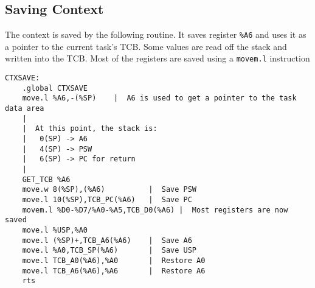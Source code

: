 \documentclass[10pt, openany]{book}
\begin{document}
\subsection{Saving Context}
The context is saved by the following routine.  It saves register \verb|%A6| and uses it as a pointer to the current task's TCB.  Some values are read off the stack and written into the TCB.  Most of the registers are saved using a \verb|movem.l| instruction
\begin{lstlisting}
CTXSAVE:
    .global CTXSAVE
    move.l %A6,-(%SP)    |  A6 is used to get a pointer to the task data area
    |
    |  At this point, the stack is:
    |   0(SP) -> A6
    |   4(SP) -> PSW
    |   6(SP) -> PC for return
    |
    GET_TCB %A6
    move.w 8(%SP),(%A6)          |  Save PSW
    move.l 10(%SP),TCB_PC(%A6)   |  Save PC
    movem.l %D0-%D7/%A0-%A5,TCB_D0(%A6) |  Most registers are now saved
    move.l %USP,%A0
    move.l (%SP)+,TCB_A6(%A6)    |  Save A6
    move.l %A0,TCB_SP(%A6)       |  Save USP
    move.l TCB_A0(%A6),%A0       |  Restore A0
    move.l TCB_A6(%A6),%A6       |  Restore A6
    rts
\end{lstlisting}
\end{document}
